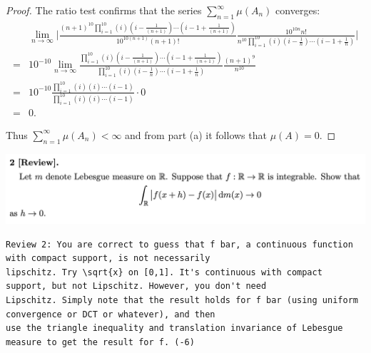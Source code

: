 \begin{enumerate}[label=(\alph*)]
\begin{proof}
  The ratio test confirms that the series $\sum_{n=1}^\infty \mu(A_n)$ converges:
  \begin{align*}
    &\lim_{n\to\infty} \Bigg|\frac{(n+1)^{10}\prod_{i=1}^{10} (i)(i -\frac{1}{(n+1)} )\cdots(i - 1 +\frac{1}{(n+1)} )}{10^{10(n+1)}(n+1)!}     \frac{10^{10n}n!}{n^{10}\prod_{i=1}^{10} (i)(i -\frac{1}{n} )\cdots(i - 1 +\frac{1}{n} )}\Bigg| \\
    = &10^{-10}\lim_{n\to\infty} \frac{\prod_{i=1}^{10} (i)(i -\frac{1}{(n+1)} )\cdots(i - 1 +\frac{1}{(n+1)} )}{\prod_{i=1}^{10} (i)(i -\frac{1}{n} )\cdots(i - 1 +\frac{1}{n} )}     \frac{(n+1)^{9}}{n^{10}} \\
    = &10^{-10}\frac{\prod_{i=1}^{10} (i)(i )\cdots(i - 1  )}{\prod_{i=1}^{10} (i)(i )\cdots(i - 1 )}   \cdot  0 \\
    = &0.
  \end{align*}

  Thus $\sum_{n=1}^\infty \mu(A_n) < \infty$ and from part (a) it follows that $\mu(A) = 0$.
\end{proof}
\end{enumerate}

\newpage
\begin{mdframed}
\includegraphics[width=400pt]{img/analysis--berkeley-202a-hw10-5e9e.png}
\end{mdframed}

\begin{verbatim}
Review 2: You are correct to guess that f bar, a continuous function with compact support, is not necessarily
lipschitz. Try \sqrt{x} on [0,1]. It's continuous with compact support, but not Lipschitz. However, you don't need
Lipschitz. Simply note that the result holds for f bar (using uniform convergence or DCT or whatever), and then
use the triangle inequality and translation invariance of Lebesgue measure to get the result for f. (-6)
\end{verbatim}

